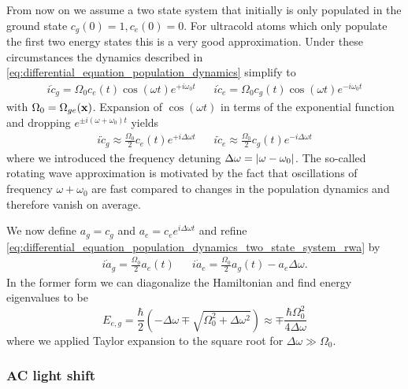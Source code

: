 From now on we assume a two state system that initially is only populated in
the ground state $c_g(0)=1,c_e(0)=0$. For ultracold atoms which only populate
the first two energy states this is a very good approximation. Under these
circumstances the dynamics described in
\cref{eq:differential_equation_population_dynamics} simplify to
\begin{align}
  i\dot{c}_g=\Omega_0c_e(t)\cos(\omega t)e^{+i\omega_0 t} &&
  i\dot{c}_e=\Omega_0c_g(t)\cos(\omega t)e^{-i\omega_0 t}
  \label{eq:differential_equation_population_dynamics_two_state_system}
\end{align}
with $\Omega_0=\Omega_{ge}(\vb{x})$. Expansion of $\cos(\omega t)$ in terms
of the exponential function and dropping $e^{\pm i(\omega+\omega_0)t}$ yields
\begin{align}
  i\dot{c}_g\approx\frac{\Omega_0}{2}c_e(t)e^{+i\Delta\omega t} &&
  i\dot{c}_e\approx\frac{\Omega_0}{2}c_g(t)e^{-i\Delta\omega t}
  \label{eq:differential_equation_population_dynamics_two_state_system_rwa}
\end{align}
where we introduced the frequency detuning
$\Delta\omega=\abs{\omega-\omega_0}$. The so-called rotating wave
approximation is motivated by the fact that oscillations of frequency
$\omega+\omega_0$ are fast compared to changes in the population dynamics and
therefore vanish on average.

We now define $a_g=c_g$ and $a_e=c_ee^{i\Delta\omega t}$ and refine
\cref{eq:differential_equation_population_dynamics_two_state_system_rwa} by
\begin{align}
  i\dot{a}_g=\frac{\Omega_0}{2}a_e(t) &&
  i\dot{a}_e=\frac{\Omega_0}{2}a_g(t)-a_e\Delta\omega
  \label{eq:differential_equation_population_dynamics_two_state_system_shift}.
\end{align}
In the former form we can diagonalize the Hamiltonian and find energy
eigenvalues to be
\begin{equation}
  E_{e,g}
  =\frac{\hbar}{2}\left(-\Delta\omega\mp\sqrt{\Omega_0^2+\Delta\omega^2}\right)
  \approx
  \mp\frac{\hbar\Omega_0^2}{4\Delta\omega}
  \label{eq:eigenvalues_energy_light_shift}
\end{equation}
where we applied Taylor expansion to the square root for
$\Delta\omega\gg\Omega_0$.

\subsubsection{AC light shift}

